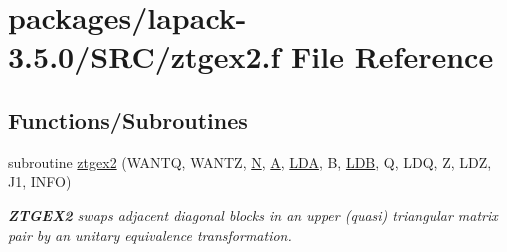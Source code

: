 \hypertarget{ztgex2_8f}{}\section{packages/lapack-\/3.5.0/\+S\+R\+C/ztgex2.f File Reference}
\label{ztgex2_8f}
\subsection*{Functions/\+Subroutines}
\begin{DoxyCompactItemize}
\item 
subroutine \hyperlink{group__complex16GEauxiliary_ga9b8dc8981846f349260173092928b059}{ztgex2} (W\+A\+N\+T\+Q, W\+A\+N\+T\+Z, \hyperlink{polmisc_8c_a0240ac851181b84ac374872dc5434ee4}{N}, \hyperlink{classA}{A}, \hyperlink{example__user_8c_ae946da542ce0db94dced19b2ecefd1aa}{L\+D\+A}, B, \hyperlink{example__user_8c_a50e90a7104df172b5a89a06c47fcca04}{L\+D\+B}, Q, L\+D\+Q, Z, L\+D\+Z, J1, I\+N\+F\+O)
\begin{DoxyCompactList}\small\item\em {\bfseries Z\+T\+G\+E\+X2} swaps adjacent diagonal blocks in an upper (quasi) triangular matrix pair by an unitary equivalence transformation. \end{DoxyCompactList}\end{DoxyCompactItemize}
